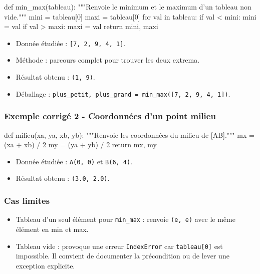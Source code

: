 \begin{python}
def min_max(tableau):
    """Renvoie le minimum et le maximum d’un tableau non vide."""
    mini = tableau[0]
    maxi = tableau[0]
    for val in tableau:
        if val < mini:
            mini = val
        if val > maxi:
            maxi = val
    return mini, maxi
\end{python}

\begin{itemize}
\tightlist
\item
  Donnée étudiée : \texttt{{[}7,\ 2,\ 9,\ 4,\ 1{]}}.
\item
  Méthode : parcours complet pour trouver les deux extrema.
\item
  Résultat obtenu : \texttt{(1,\ 9)}.
\item
  Déballage :
  \texttt{plus\_petit,\ plus\_grand\ =\ min\_max({[}7,\ 2,\ 9,\ 4,\ 1{]})}.
\end{itemize}

\subsubsection{Exemple corrigé 2 - Coordonnées d’un point milieu}

\begin{python}
def milieu(xa, ya, xb, yb):
    """Renvoie les coordonnées du milieu de [AB]."""
    mx = (xa + xb) / 2
    my = (ya + yb) / 2
    return mx, my
\end{python}

\begin{itemize}
\tightlist
\item
  Donnée étudiée : \texttt{A(0,\ 0)} et \texttt{B(6,\ 4)}.
\item
  Résultat obtenu : \texttt{(3.0,\ 2.0)}.
\end{itemize}

\subsubsection{Cas limites}

\begin{itemize}
\tightlist
\item
  Tableau d'un seul élément pour \texttt{min\_max} : renvoie
  \texttt{(e,\ e)} avec le même élément en min et max.
\item
  Tableau vide : provoque une erreur \texttt{IndexError} car
  \texttt{tableau{[}0{]}} est impossible. Il convient de documenter la
  précondition ou de lever une exception explicite.
\end{itemize}

